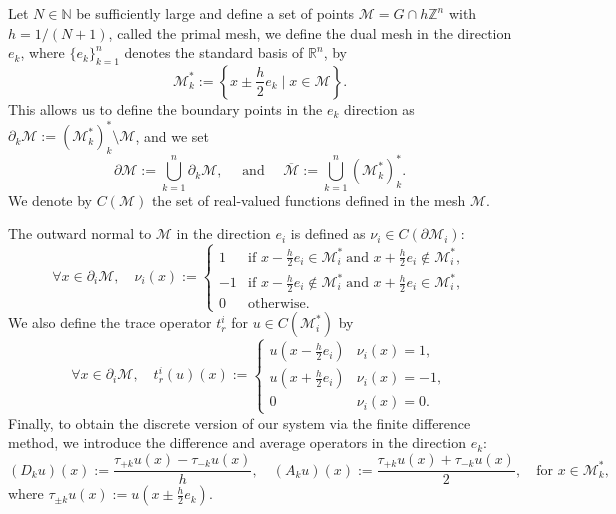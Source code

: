 \documentclass[11pt,oneside,leqno]{amsart}
\numberwithin{equation}{section}
\numberwithin{equation}{section}
\begin{document}
Let $N\in\mathbb{N}$ be sufficiently large and define a set of points $\mathcal{M}= G\cap h\mathbb{Z}^{n}$ with $h=1/(N+1)$, called the primal mesh, we define the dual mesh in the direction $e_{k}$, where $\{e_{k}\}_{k=1}^{n}$ denotes the standard basis of $\mathbb{R}^{n}$, by
\begin{equation*}
    \mathcal{M}_{k}^{\ast}:= \left\{ x\pm\frac{h}{2}e_{k}\mid x\in \mathcal{M}\right\}.
\end{equation*}
This allows us to define the boundary points in the $e_{k}$ direction as $
    \partial_{k}\mathcal{M}:= (\mathcal{M}^{\ast}_{k})^{\ast}_{k}\setminus \mathcal{M}$,
and we set
\[
        \partial \mathcal{M}:=\bigcup_{k=1}^{n} \partial_{k}\mathcal{M},\quad\textrm{ and }\quad 
        \overline{\mathcal{M}}:=\bigcup_{k=1}^{n} (\mathcal{M}^{\ast}_{k})^{\ast}_{k}.
\]
We denote by $C(\mathcal{M})$ the set of real-valued functions defined in the mesh $\mathcal{M}$. 

The outward normal to $\mathcal{M}$ in the direction $e_{i}$ is defined as $\nu_{i}\in C(\partial\mathcal{M}_{i})$:
\begin{equation}\label{normal:function}
    \forall x\in\partial_{i}\mathcal{M}, \quad
    \nu_{i}(x):=\begin{cases} 
     1 &  \mbox{if }x-\tfrac{h}{2}e_i\in \mathcal{M}_{i}^{\ast} \ \mbox{and } x+\tfrac{h}{2}e_i\notin\mathcal{M}_{i}^{\ast},\\ 
    -1 &  \mbox{if }x-\tfrac{h}{2}e_i\notin \mathcal{M}_{i}^{\ast} \ \mbox{and }x+\tfrac{h}{2}e_i\in\mathcal{M}_{i}^{\ast},\\ 
     0 &  \mbox{otherwise}.
    \end{cases}
\end{equation}
We also define the trace operator $t_{r}^{i}$ for $u\in C(\mathcal{M}^{\ast}_{i})$ by
\begin{equation}
    \forall x\in \partial_{i}\mathcal{M},\quad 
    t_{r}^{i}(u)(x):=\begin{cases}
    u\!\left(x-\tfrac{h}{2}e_i\right) & \nu_{i}(x)=1,\\
    u\!\left(x+\tfrac{h}{2}e_i\right) & \nu_{i}(x)=-1,\\
     0 & \nu_{i}(x)=0 .
    \end{cases}
\end{equation}
Finally, to obtain the discrete version of our system via the finite difference method, we introduce the difference and average operators in the direction $e_{k}$:
\begin{equation*}
    (D_{k}u)(x):=\frac{\tau_{+k}u(x)-\tau_{-k}u(x)}{h},\quad
    (A_{k}u)(x):=\frac{\tau_{+k}u(x)+\tau_{-k}u(x)}{2},\quad \text{for }x\in\mathcal{M}^{\ast}_{k},
\end{equation*}
where $\tau_{\pm k}u(x):= u\!\left(x\pm\frac{h}{2}e_{k}\right)$.
\end{document}
